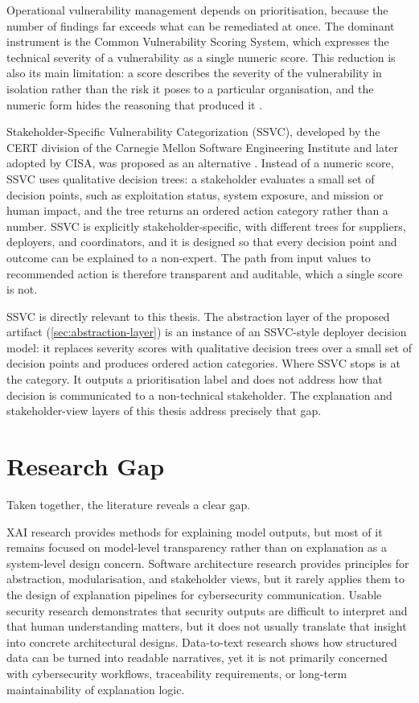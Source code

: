 Operational vulnerability management depends on prioritisation, because the number of findings far exceeds what can be remediated at once. The dominant instrument is the Common Vulnerability Scoring System, which expresses the technical severity of a vulnerability as a single numeric score. This reduction is also its main limitation: a score describes the severity of the vulnerability in isolation rather than the risk it poses to a particular organisation, and the numeric form hides the reasoning that produced it \cite{spring2021ssvc}.

Stakeholder-Specific Vulnerability Categorization (SSVC), developed by the CERT division of the Carnegie Mellon Software Engineering Institute and later adopted by CISA, was proposed as an alternative \cite{spring2021ssvc}. Instead of a numeric score, SSVC uses qualitative decision trees: a stakeholder evaluates a small set of decision points, such as exploitation status, system exposure, and mission or human impact, and the tree returns an ordered action category rather than a number. SSVC is explicitly stakeholder-specific, with different trees for suppliers, deployers, and coordinators, and it is designed so that every decision point and outcome can be explained to a non-expert. The path from input values to recommended action is therefore transparent and auditable, which a single score is not.

SSVC is directly relevant to this thesis. The abstraction layer of the proposed artifact (\cref{sec:abstraction-layer}) is an instance of an SSVC-style deployer decision model: it replaces severity scores with qualitative decision trees over a small set of decision points and produces ordered action categories. Where SSVC stops is at the category. It outputs a prioritisation label and does not address how that decision is communicated to a non-technical stakeholder. The explanation and stakeholder-view layers of this thesis address precisely that gap.

\section{Research Gap}

Taken together, the literature reveals a clear gap.

XAI research provides methods for explaining model outputs, but most of it remains focused on model-level transparency rather than on explanation as a system-level design concern. Software architecture research provides principles for abstraction, modularisation, and stakeholder views, but it rarely applies them to the design of explanation pipelines for cybersecurity communication. Usable security research demonstrates that security outputs are difficult to interpret and that human understanding matters, but it does not usually translate that insight into concrete architectural designs. Data-to-text research shows how structured data can be turned into readable narratives, yet it is not primarily concerned with cybersecurity workflows, traceability requirements, or long-term maintainability of explanation logic.

